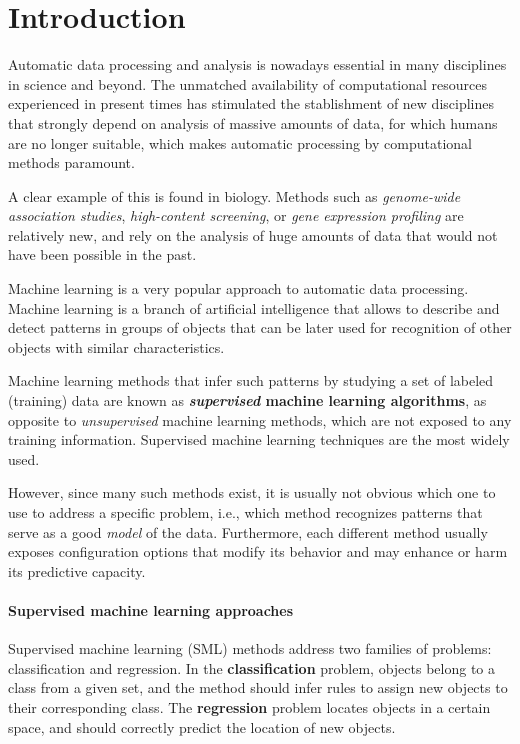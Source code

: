 \chapter{Introduction}

Automatic data processing and analysis is nowadays essential in many disciplines in science and
beyond. The unmatched availability of computational resources experienced in present times has
stimulated the stablishment of new disciplines that strongly depend on analysis of massive amounts
of data, for which humans are no longer suitable, which makes automatic processing by computational
methods paramount.

A clear example of this is found in biology. Methods such as \emph{genome-wide association
studies}, \emph{high-content screening}, or \emph{gene expression profiling} are relatively new, and
rely on the analysis of huge amounts of data that would not have been possible in the past.

Machine learning is a very popular approach to automatic data processing. Machine learning is a
branch of artificial intelligence that allows to describe and detect patterns in groups of objects
that can be later used for recognition of other objects with similar characteristics.

Machine learning methods that infer such patterns by studying a set of labeled (training) data are
known as {\bf \emph{supervised} machine learning algorithms}, as opposite to \emph{unsupervised} machine
learning methods, which are not exposed to any training information. 
Supervised machine learning techniques are the most widely used.


However, since many such methods exist, it is usually not obvious which one to use to address a specific
problem, i.e., which method recognizes patterns that serve as a good \emph{model} of the data.
Furthermore, each different method usually exposes configuration options that modify its behavior and
may enhance or harm its predictive capacity.

\subsubsection{Supervised machine learning approaches}

	Supervised machine learning (SML) methods address two families of problems: classification and
	regression. In the {\bf classification} problem, objects belong to a class from a given set, and
	the method should infer rules to assign new objects to their corresponding class. The {\bf
	regression} problem locates objects in a certain space, and should correctly predict the
	location of new objects.  %

